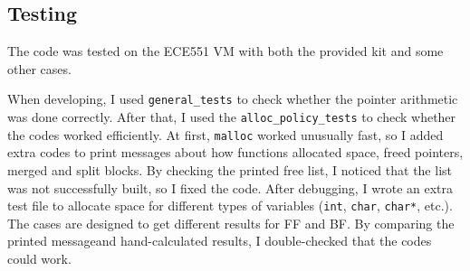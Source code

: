 \documentclass[a4paper,12pt]{article}
\begin{document}
	\subsection{Testing}
	\par The code was tested on the ECE551 VM with both the provided kit and some other cases. 
	\par When developing, I used \texttt{general\_tests} to check whether the pointer arithmetic was done correctly. After that, I used the \texttt{alloc\_policy\_tests} to check whether the codes worked efficiently. At first, \texttt{malloc} worked unusually fast, so I added extra codes to print messages about how functions allocated space, freed pointers, merged and split blocks. By checking the printed free list, I noticed that the list was not successfully built, so I fixed the code. After debugging, I wrote an extra test file to allocate space for different types of variables (\texttt{int}, \texttt{char}, \texttt{char*}, etc.). The cases are designed to get different results for FF and BF. By comparing the printed messageand hand-calculated results, I double-checked that the codes could work. 
	
\end{document}
